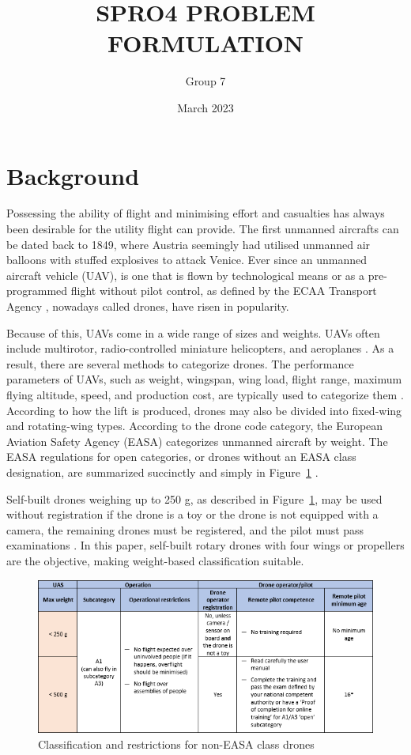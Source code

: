 \documentclass[a4paper,11pt]{article}
\title{SPRO4 PROBLEM FORMULATION}
\author{Group 7}
\date{March 2023}
\begin{document}
\maketitle

\section{Background}

Possessing the ability of flight and minimising effort and casualties has always been desirable for the utility flight can provide.
The first unmanned aircrafts can be dated back to 1849, where Austria seemingly had utilised unmanned air balloons with stuffed explosives to attack Venice. \cite{Vyas2020}
Ever since an unmanned aircraft vehicle (UAV), is one that is flown by technological means or as a pre-programmed flight without pilot control, as defined by the ECAA Transport Agency \cite{Droner}, nowadays called drones, have risen in popularity.


Because of this, UAVs come in a wide range of sizes and weights.
UAVs often include multirotor, radio-controlled miniature helicopters, and aeroplanes \cite{Ann2012}.
As a result, there are several methods to categorize drones. The performance parameters of UAVs, such as weight, wingspan, wing load, flight range, maximum flying altitude, speed, and production cost, are typically used to categorize them \cite{Hassanalian2017}.
According to how the lift is produced, drones may also be divided into fixed-wing and rotating-wing types.
According to the drone code category, the European Aviation Safety Agency (EASA) categorizes unmanned aircraft by weight.
The EASA regulations for open categories, or drones without an EASA class designation, are summarized succinctly and simply in Figure~\ref{fig:Table} \cite{Euasa}.

Self-built drones weighing up to 250 g, as described in Figure~\ref{fig:Table}, may be used without registration if the drone is a toy or the drone is not equipped with a camera, the remaining drones must be registered, and the pilot must pass examinations \cite{Euasa}. In this paper, self-built rotary drones with four wings or propellers are the objective, making weight-based classification suitable.

\begin{figure}[H]
    \centering
    \includegraphics[scale = 0.9]{classification.PNG}
    \caption{Classification and restrictions for non-EASA class drones \cite{Euasa}}
    \label{fig:Table}
\end{figure}
\end{document}
